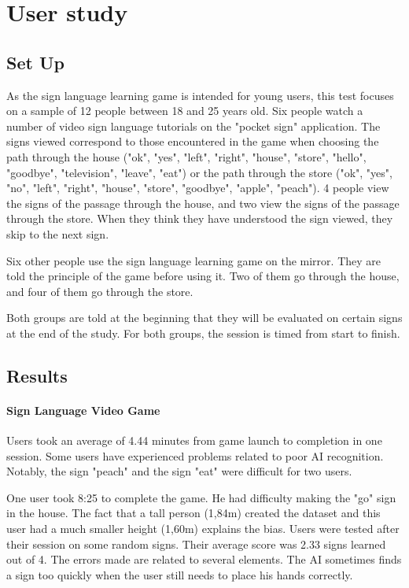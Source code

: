 \section{User study}

\subsection{Set Up}

As the sign language learning game is intended for young users, this test focuses on a sample of 12 people between 18 and 25 years old.
Six people watch a number of video sign language tutorials on the "pocket sign" application. The signs viewed correspond to those encountered in the game when choosing the path through the house ("ok", "yes", "left", "right", "house", "store", "hello", "goodbye", "television", "leave", "eat") or the path through the store ("ok", "yes", "no", "left", "right", "house", "store", "goodbye", "apple", "peach"). 4 people view the signs of the passage through the house, and two view the signs of the passage through the store.
When they think they have understood the sign viewed, they skip to the next sign. 

Six other people use the sign language learning game on the mirror. They are told the principle of the game before using it. Two of them go through the house, and four of them go through the store.

Both groups are told at the beginning that they will be evaluated on certain signs at the end of the study. 
For both groups, the session is timed from start to finish.
\subsection{Results}

\paragraph{Sign Language Video Game}

Users took an average of 4.44 minutes from game launch to completion in one session. Some users have experienced problems related to poor AI recognition.
Notably, the sign "peach" and the sign "eat" were difficult for two users.

One user took 8:25 to complete the game. He had difficulty making the "go" sign in the house. The fact that a tall person  (1,84m) created the dataset and this user had a much smaller height (1,60m) explains the bias. Users were tested after their session on some random signs. Their average score was 2.33 signs learned out of 4. The errors made are related to several elements. The AI sometimes finds a sign too quickly when the user still needs to place his hands correctly. 

